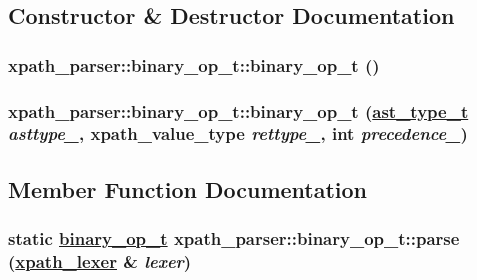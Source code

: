 \subsection{Constructor \& Destructor Documentation}
\hypertarget{structxpath__parser_1_1binary__op__t_18cac63911120c27f5ee842b1e6afe35}{
\subsubsection[binary\_\-op\_\-t]{\setlength{\rightskip}{0pt plus 5cm}xpath\_\-parser::binary\_\-op\_\-t::binary\_\-op\_\-t ()}}
\label{structxpath__parser_1_1binary__op__t_18cac63911120c27f5ee842b1e6afe35}


\hypertarget{structxpath__parser_1_1binary__op__t_6b8a545436af8aa0c74c91e181a2b865}{
\subsubsection[binary\_\-op\_\-t]{\setlength{\rightskip}{0pt plus 5cm}xpath\_\-parser::binary\_\-op\_\-t::binary\_\-op\_\-t (\hyperlink{pugixml_8cpp_11258a240266b84b6b0526930e5d330d}{ast\_\-type\_\-t} {\em asttype\_\-}, xpath\_\-value\_\-type {\em rettype\_\-}, int {\em precedence\_\-})}}
\label{structxpath__parser_1_1binary__op__t_6b8a545436af8aa0c74c91e181a2b865}




\subsection{Member Function Documentation}
\hypertarget{structxpath__parser_1_1binary__op__t_723f5f2b66df47b4ac74455cb39b9544}{
\subsubsection[parse]{\setlength{\rightskip}{0pt plus 5cm}static \hyperlink{structxpath__parser_1_1binary__op__t}{binary\_\-op\_\-t} xpath\_\-parser::binary\_\-op\_\-t::parse (\hyperlink{classxpath__lexer}{xpath\_\-lexer} \& {\em lexer})}}
\label{structxpath__parser_1_1binary__op__t_723f5f2b66df47b4ac74455cb39b9544}




